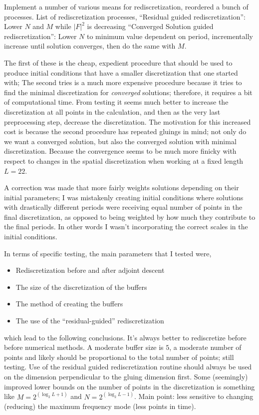\begin{description}
{\begin{description}
Implement a number of various means for rediscretization, reordered a bunch of processes.
List of rediscretization processes, ``Residual guided rediscretization'': Lower $N$ and $M$ while $|F|^2$ is decreasing
``Converged Solution guided rediscretization'': Lower $N$ to minimum value dependent on period, incrementally increase until solution converges, then do
the same with $M$.

The first of these is the cheap, expedient procedure that should be used to produce initial conditions that
have a smaller discretization that one started with; The second tries is a much more expensive procedure
because it tries to find the minimal discretization for \emph{converged} solutions; therefore, it requires
a bit of computational time. From testing it seems much better to increase the discretization at all points
in the calculation, and then as the very last preprocessing step, decrease the discretization.
The motivation for this increased cost is because the second procedure has repeated gluings in mind; not only
do we want a converged solution, but also the converged solution with minimal discretization. Because the convergence
seems to be much more finicky with respect to changes in the spatial discretization when working at a fixed
length $L=22$.

A correction was made that more fairly weights solutions depending on their initial parameters; I was mistakenly
creating initial conditions where solutions with drastically different periods were receiving equal number of points
in the final discretization, as opposed to being weighted by how much they contribute to the final periods. In other
words I wasn't incorporating the correct scales in the initial conditions.

In terms of specific testing, the main parameters that I tested were,
\begin{itemize}
\item Rediscretization before and after adjoint descent
\item The size of the discretization of the buffers
\item The method of creating the buffers
\item The use of the ``residual-guided'' rediscretization
\end{itemize}

which lead to the following conclusions. It's always better to rediscretize before
before numerical methods. A moderate buffer size is $5$, a moderate number of points and
likely should be proportional to the total number of points; still testing.
Use of the residual guided rediscretization routine should always
be used on the dimension perpendicular to the gluing dimension first.
Some (seemingly) improved lower bounds on the number of points in the discretization
is something like $M = 2^(\log_2 L + 1)$ and $N = 2^(\log_2 L -1)$.
Main point: less sensitive to changing (reducing) the maximum frequency
mode (less points in time).


\end{description}}
\end{description}
